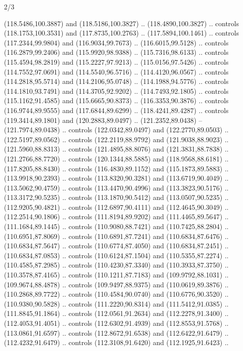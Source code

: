 \begin{flagdescription}{2/3}
\begin{scope}[shift={(0.5\flaglength,0.5)},scale=\flagwidth/320]
\begin{scope}[y=0.8pt, x=0.8pt, yscale=-1,shift={(-118.3,-146)}]
  (118.5486,100.3887) and (118.5186,100.3827) .. (118.4890,100.3827) .. controls
  (118.1753,100.3531) and (117.8735,100.2763) .. (117.5894,100.1461) .. controls
  (117.2344,99.9804) and (116.9034,99.7673) .. (116.6015,99.5128) .. controls
  (116.2879,99.2406) and (115.9920,98.9388) .. (115.7316,98.6133) .. controls
  (115.4594,98.2819) and (115.2227,97.9213) .. (115.0156,97.5426) .. controls
  (114.7552,97.0691) and (114.5540,96.5716) .. (114.4120,96.0567) .. controls
  (114.2818,95.5714) and (114.2106,95.0748) .. (114.1988,94.5776) .. controls
  (114.1810,93.7491) and (114.3705,92.9202) .. (114.7493,92.1805) .. controls
  (115.1162,91.4585) and (115.6665,90.8373) .. (116.3353,90.3876) .. controls
  (116.9744,89.9555) and (117.6844,89.6299) .. (118.4241,89.4287) .. controls
  (119.3414,89.1801) and (120.2883,89.0497) .. (121.2352,89.0438) --
  (121.7974,89.0438) .. controls (122.0342,89.0497) and (122.2770,89.0503) ..
  (122.5197,89.0562) .. controls (122.2119,88.9792) and (121.9038,88.9023) ..
  (121.5960,88.8313) .. controls (121.4895,88.8076) and (121.3831,88.7838) ..
  (121.2766,88.7720) .. controls (120.1344,88.5885) and (118.9568,88.6181) ..
  (117.8205,88.8430) .. controls (116.4830,89.1152) and (115.1873,89.5883) ..
  (113.9918,90.2393) .. controls (113.8320,90.3281) and (113.6719,90.4049) ..
  (113.5062,90.4759) .. controls (113.4470,90.4996) and (113.3823,90.5176) ..
  (113.3172,90.5235) .. controls (113.1870,90.5412) and (113.0507,90.5235) ..
  (112.9205,90.4821) .. controls (112.6897,90.4111) and (112.4645,90.3049) ..
  (112.2514,90.1806) .. controls (111.8194,89.9202) and (111.4465,89.5647) ..
  (111.1684,89.1445) .. controls (110.9080,88.7421) and (110.7425,88.2804) ..
  (110.6951,87.8069) .. controls (110.6891,87.7241) and (110.6834,87.6476) ..
  (110.6834,87.5647) .. controls (110.6774,87.4050) and (110.6834,87.2451) ..
  (110.6834,87.0853) .. controls (110.6124,87.1504) and (110.5355,87.2274) ..
  (110.4585,87.2985) .. controls (110.4230,87.3340) and (110.3933,87.3750) ..
  (110.3578,87.4165) .. controls (110.1211,87.7183) and (109.9792,88.1031) ..
  (109.9674,88.4878) .. controls (109.9497,88.9375) and (110.0619,89.3876) ..
  (110.2868,89.7722) .. controls (110.4584,90.0740) and (110.6776,90.3520) ..
  (110.9380,90.5828) .. controls (111.2220,90.8314) and (111.5412,91.0385) ..
  (111.8845,91.1864) .. controls (112.0561,91.2634) and (112.2278,91.3400) ..
  (112.4053,91.4051) .. controls (112.6302,91.4939) and (112.8553,91.5768) ..
  (113.0861,91.6597) .. controls (112.8672,91.6538) and (112.6422,91.6479) ..
  (112.4232,91.6479) .. controls (112.3108,91.6420) and (112.1925,91.6423) ..

\end{scope}
\end{scope}
\end{flagdescription}
